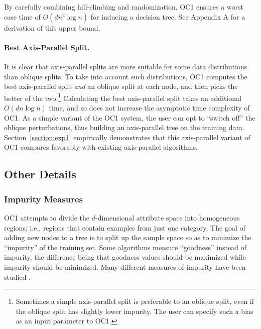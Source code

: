 By carefully combining hill-climbing and randomization, OC1 ensures a
worst case time of $O(dn^2 \log n)$ for inducing a decision tree.  See
Appendix A for a derivation of this upper bound.

\paragraph{Best Axis-Parallel Split.}
It is clear that axis-parallel splits are more suitable for some data
distributions than oblique splits. To take into account such
distributions, OC1 computes the best axis-parallel split {\em and} an
oblique split at each node, and then picks the better of the
two.\footnote{Sometimes a simple axis-parallel split is preferable to
an oblique split, even if the oblique split has slightly lower
impurity. The user can specify such a bias as an input parameter to
OC1.} Calculating the best axis-parallel split takes an additional
$O(dn \log n)$ time, and so does not increase the asymptotic time
complexity of OC1.  As a simple variant of the OC1 system, the user
can opt to ``switch off'' the oblique perturbations, thus building an
axis-parallel tree on the training data.  Section~\ref{section:exp1}
empirically demonstrates that this axis-parallel variant of OC1
compares favorably with existing axis-parallel algorithms.

\subsection{Other Details}
\label{section:details}

\subsubsection{Impurity Measures}
\label{section:impmeasures}
OC1 attempts to divide the $d$-dimensional attribute space into
homogeneous regions; i.e., regions that contain examples from just one
category.  The goal of adding new nodes to a tree is to split up the
sample space so as to minimize the ``impurity'' of the training set.
Some algorithms measure ``goodness'' instead of impurity, the
difference being that goodness values should be maximized while
impurity should be minimized.  Many different measures of
impurity have been studied \cite{breiman/etal/84,quinlan/86,%
mingers/89a,buntine/niblett/92,fayyad/irani/92b,heath/etal/93}. 

